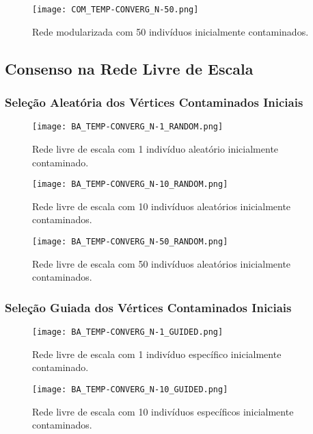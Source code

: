\documentclass{article}
\begin{document}
\begin{figure}[H]
  \centerline{\texttt{[image: COM\_TEMP-CONVERG\_N-50.png]}}
  \caption{Rede modularizada com 50 indivíduos inicialmente contaminados.}
  \label{fig:boat1}
\end{figure}

\subsection{Consenso na Rede Livre de Escala}

\subsubsection{Seleção Aleatória dos Vértices Contaminados Iniciais}

\begin{figure}[H]
  \centerline{\texttt{[image: BA\_TEMP-CONVERG\_N-1\_RANDOM.png]}}
  \caption{Rede livre de escala com 1 indivíduo aleatório inicialmente contaminado.}
  \label{fig:boat1}
\end{figure}

\begin{figure}[H]
  \centerline{\texttt{[image: BA\_TEMP-CONVERG\_N-10\_RANDOM.png]}}
  \caption{Rede livre de escala com 10 indivíduos aleatórios inicialmente contaminados.}
  \label{fig:boat1}
\end{figure}

\begin{figure}[H]
  \centerline{\texttt{[image: BA\_TEMP-CONVERG\_N-50\_RANDOM.png]}}
  \caption{Rede livre de escala com 50 indivíduos aleatórios inicialmente contaminados.}
  \label{fig:boat1}
\end{figure}

\subsubsection{Seleção Guiada dos Vértices Contaminados Iniciais}

\begin{figure}[H]
  \centerline{\texttt{[image: BA\_TEMP-CONVERG\_N-1\_GUIDED.png]}}
  \caption{Rede livre de escala com 1 indivíduo específico inicialmente contaminado.}
  \label{fig:boat1}
\end{figure}

\begin{figure}[H]
  \centerline{\texttt{[image: BA\_TEMP-CONVERG\_N-10\_GUIDED.png]}}
  \caption{Rede livre de escala com 10 indivíduos específicos inicialmente contaminados.}
  \label{fig:boat1}
\end{figure}
\end{document}
